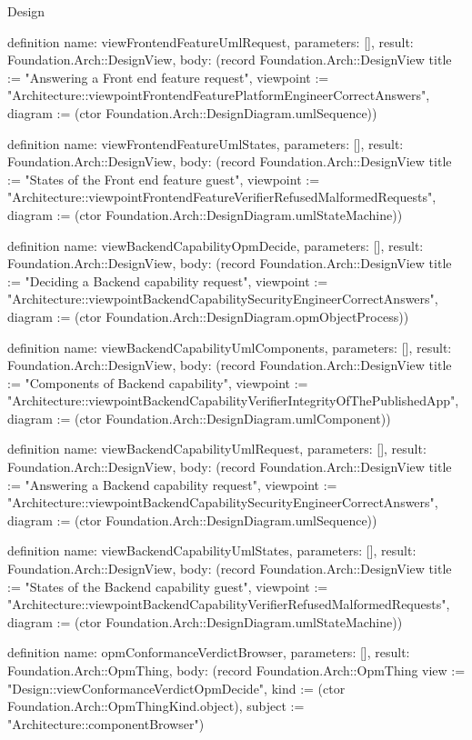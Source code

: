 \begin{lexlean}{Design}
\begin{semanticmodule}
definition{
  name: viewFrontendFeatureUmlRequest,
  parameters: [],
  result: Foundation.Arch::DesignView,
  body: (record Foundation.Arch::DesignView {title := "Answering a Front end feature request", viewpoint := "Architecture::viewpointFrontendFeaturePlatformEngineerCorrectAnswers", diagram := (ctor Foundation.Arch::DesignDiagram.umlSequence)})
}

definition{
  name: viewFrontendFeatureUmlStates,
  parameters: [],
  result: Foundation.Arch::DesignView,
  body: (record Foundation.Arch::DesignView {title := "States of the Front end feature guest", viewpoint := "Architecture::viewpointFrontendFeatureVerifierRefusedMalformedRequests", diagram := (ctor Foundation.Arch::DesignDiagram.umlStateMachine)})
}

definition{
  name: viewBackendCapabilityOpmDecide,
  parameters: [],
  result: Foundation.Arch::DesignView,
  body: (record Foundation.Arch::DesignView {title := "Deciding a Backend capability request", viewpoint := "Architecture::viewpointBackendCapabilitySecurityEngineerCorrectAnswers", diagram := (ctor Foundation.Arch::DesignDiagram.opmObjectProcess)})
}

definition{
  name: viewBackendCapabilityUmlComponents,
  parameters: [],
  result: Foundation.Arch::DesignView,
  body: (record Foundation.Arch::DesignView {title := "Components of Backend capability", viewpoint := "Architecture::viewpointBackendCapabilityVerifierIntegrityOfThePublishedApp", diagram := (ctor Foundation.Arch::DesignDiagram.umlComponent)})
}

definition{
  name: viewBackendCapabilityUmlRequest,
  parameters: [],
  result: Foundation.Arch::DesignView,
  body: (record Foundation.Arch::DesignView {title := "Answering a Backend capability request", viewpoint := "Architecture::viewpointBackendCapabilitySecurityEngineerCorrectAnswers", diagram := (ctor Foundation.Arch::DesignDiagram.umlSequence)})
}

definition{
  name: viewBackendCapabilityUmlStates,
  parameters: [],
  result: Foundation.Arch::DesignView,
  body: (record Foundation.Arch::DesignView {title := "States of the Backend capability guest", viewpoint := "Architecture::viewpointBackendCapabilityVerifierRefusedMalformedRequests", diagram := (ctor Foundation.Arch::DesignDiagram.umlStateMachine)})
}

definition{
  name: opmConformanceVerdictBrowser,
  parameters: [],
  result: Foundation.Arch::OpmThing,
  body: (record Foundation.Arch::OpmThing {view := "Design::viewConformanceVerdictOpmDecide", kind := (ctor Foundation.Arch::OpmThingKind.object), subject := "Architecture::componentBrowser"})
}


\end{semanticmodule}
\end{lexlean}
